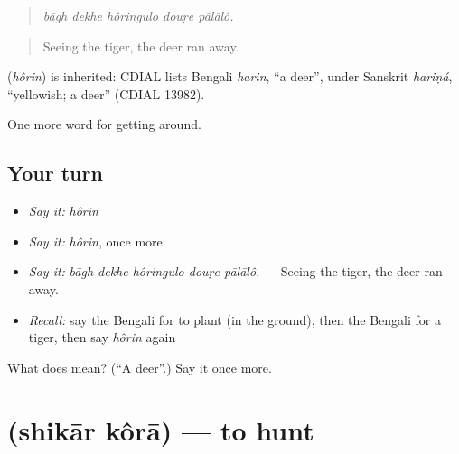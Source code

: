 \begin{quote}
    
\end{quote}

\begin{quote}
\emph{bāgh dekhe hôringulo douṛe pālālô.}
\end{quote}

\begin{quote}
Seeing the tiger, the deer ran away.
\end{quote}

\begin{cousinweb}
\textbf{} (\emph{hôrin}) is inherited: CDIAL lists Bengali \emph{harin}, \textquotedblleft{}a deer\textquotedblright{}, under Sanskrit \emph{hariṇá}, \textquotedblleft{}yellowish; a deer\textquotedblright{} (CDIAL 13982).
\end{cousinweb}

\begin{grammarlens}[title={What you've built}]
One more word for getting around.
\end{grammarlens}

\subsection*{Your turn}
\begin{itemize}
\raggedright
  \item \emph{Say it:} \emph{hôrin}
  \item \emph{Say it:} \emph{hôrin}, once more
  \item \emph{Say it:} \emph{bāgh dekhe hôringulo douṛe pālālô.} — Seeing the tiger, the deer ran away.
  \item \emph{Recall:} say the Bengali for to plant (in the ground), then the Bengali for a tiger, then say \emph{hôrin} again
\end{itemize}

\begin{tcolorbox}[breakable,colback=teal!4,colframe=teal!35!black,title={Before you move on}]
What does  mean? (\textquotedblleft{}A deer\textquotedblright{}.) Say it once more.
\end{tcolorbox}
\section[\texorpdfstring{\bn{শিকার} \bn{করা} (shikār kôrā)}{শিকার করা (shikār kôrā)}]{  (shikār kôrā) — to hunt}

